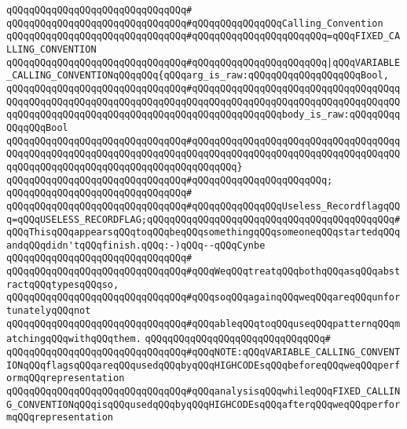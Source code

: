 \verb|qQQqqQQqqQQqqQQqqQQqqQQqqQQqqQQq#|\newline
\verb|qQQqqQQqqQQqqQQqqQQqqQQqqQQqqQQq#qQQqqQQqqQQqqQQqCalling_Convention|\newline
\verb|qQQqqQQqqQQqqQQqqQQqqQQqqQQqqQQq#qQQqqQQqqQQqqQQqqQQqqQQq=qQQqFIXED_CALLING_CONVENTION|\newline
\verb|qQQqqQQqqQQqqQQqqQQqqQQqqQQqqQQq#qQQqqQQqqQQqqQQqqQQqqQQq|\verb#|qQQqVARIABLE_CALLING_CONVENTIONqQQqqQQq{qQQqarg_is_raw:qQQqqQQqqQQqqQQqqQQqBool,#\newline
\verb|qQQqqQQqqQQqqQQqqQQqqQQqqQQqqQQq#qQQqqQQqqQQqqQQqqQQqqQQqqQQqqQQqqQQqqQQqqQQqqQQqqQQqqQQqqQQqqQQqqQQqqQQqqQQqqQQqqQQqqQQqqQQqqQQqqQQqqQQqqQQqqQQqqQQqqQQqqQQqqQQqqQQqqQQqqQQqqQQqqQQqqQQqqQQqbody_is_raw:qQQqqQQqqQQqqQQqBool|\newline
\verb|qQQqqQQqqQQqqQQqqQQqqQQqqQQqqQQq#qQQqqQQqqQQqqQQqqQQqqQQqqQQqqQQqqQQqqQQqqQQqqQQqqQQqqQQqqQQqqQQqqQQqqQQqqQQqqQQqqQQqqQQqqQQqqQQqqQQqqQQqqQQqqQQqqQQqqQQqqQQqqQQqqQQqqQQqqQQqqQQqqQQq}|\newline
\verb|qQQqqQQqqQQqqQQqqQQqqQQqqQQqqQQq#qQQqqQQqqQQqqQQqqQQqqQQq;|\newline
\verb|qQQqqQQqqQQqqQQqqQQqqQQqqQQqqQQq#|\newline
\verb|qQQqqQQqqQQqqQQqqQQqqQQqqQQqqQQq#qQQqqQQqqQQqqQQqUseless_RecordflagqQQq=qQQqUSELESS_RECORDFLAG;qQQqqQQqqQQqqQQqqQQqqQQqqQQqqQQqqQQqqQQqqQQq#qQQqThisqQQqappearsqQQqtoqQQqbeqQQqsomethingqQQqsomeoneqQQqstartedqQQqandqQQqdidn'tqQQqfinish.qQQq:-)qQQq--qQQqCynbe|\newline
\verb|qQQqqQQqqQQqqQQqqQQqqQQqqQQqqQQq#|\newline
\verb|qQQqqQQqqQQqqQQqqQQqqQQqqQQqqQQq#qQQqWeqQQqtreatqQQqbothqQQqasqQQqabstractqQQqtypesqQQqso,|\newline
\verb|qQQqqQQqqQQqqQQqqQQqqQQqqQQqqQQq#qQQqsoqQQqagainqQQqweqQQqareqQQqunfortunatelyqQQqnot|\newline
\verb|qQQqqQQqqQQqqQQqqQQqqQQqqQQqqQQq#qQQqableqQQqtoqQQquseqQQqpatternqQQqmatchingqQQqwithqQQqthem.|\newline
\verb|qQQqqQQqqQQqqQQqqQQqqQQqqQQqqQQq#|\newline
\verb|qQQqqQQqqQQqqQQqqQQqqQQqqQQqqQQq#qQQqNOTE:qQQqVARIABLE_CALLING_CONVENTIONqQQqflagsqQQqareqQQqusedqQQqbyqQQqHIGHCODEsqQQqbeforeqQQqweqQQqperformqQQqrepresentation|\newline
\verb|qQQqqQQqqQQqqQQqqQQqqQQqqQQqqQQq#qQQqanalysisqQQqwhileqQQqFIXED_CALLING_CONVENTIONqQQqisqQQqusedqQQqbyqQQqHIGHCODEsqQQqafterqQQqweqQQqperformqQQqrepresentation|\newline
